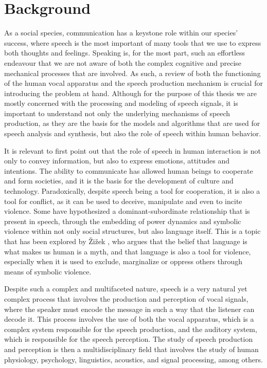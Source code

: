 \chapter{Background} \label{chap:back}

As a social species, communication has a keystone role within our species' success, where speech is the most important of many tools that we use to express both thoughts and feelings. Speaking is, for the most part, such an effortless endeavour that we are not aware of both the complex cognitive and precise mechanical processes that are involved. As such, a review of both the functioning of the human vocal apparatus and the speech production mechanism is crucial for introducing the problem at hand. Although for the purpose of this thesis we are mostly concerned with the processing and modeling of speech signals, it is important to understand not only the underlying mechanisms of speech production, as they are the basis for the models and algorithms that are used for speech analysis and synthesis, but also the role of speech within human behavior.

It is relevant to first point out that the role of speech in human interaction is not only to convey information, but also to express emotions, attitudes and intentions. The ability to communicate has allowed human beings to cooperate and form societies, and it is the basis for the development of culture and technology. Paradoxically, despite speech being a tool for cooperation, it is also a tool for conflict, as it can be used to deceive, manipulate and even to incite violence. Some have hypothesized a dominant-subordinate relationship that is present in speech, through the embedding of power dynamics and symbolic violence within not only social structures, but also language itself. This is a topic that has been explored by Žižek \cite{žižek2009violence}, who argues that the belief that language is what makes us human is a myth, and that language is also a tool for violence, especially when it is used to exclude, marginalize or oppress others through means of symbolic violence.

Despite such a complex and multifaceted nature, speech is a very natural yet complex process that involves the production and perception of vocal signals, where the speaker must encode the message in such a way that the listener can decode it. This process involves the use of both the vocal apparatus, which is a complex system responsible for the speech production, and the auditory system, which is responsible for the speech perception. The study of speech production and perception is then a multidisciplinary field that involves the study of human physiology, psychology, linguistics, acoustics, and signal processing, among others.

